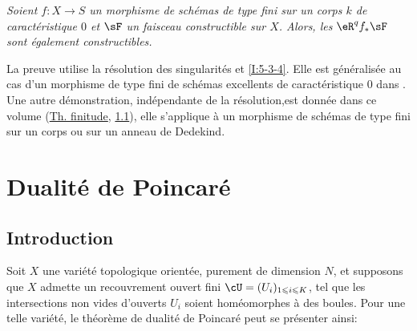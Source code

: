 \begingroup
\renewcommand*{\thesubsubsection}{3.5.2}
\begin{sourceinline}\label{I:5-3-7} %
\itshape
Soient $f:X\to S$ un morphisme de schémas de type fini sur un corps $k$ de 
caractéristique $0$ et $\sF$ un faisceau constructible sur $X$. Alors, les 
$\eR^q f_* \sF$ sont également constructibles.
\end{sourceinline}
\endgroup

La preuve utilise la résolution des singularités et \ref{I:5-3-4}. Elle est 
généralisée au cas d'un morphisme de type fini de schémas excellents de 
caractéristique $0$ dans . Une autre démonstration, 
indépendante de la résolution,est donnée dans ce volume 
(\hyperref[VII]{Th. finitude}, \hyperref[VII:1-1]{1.1}),
elle s'applique à un morphisme de schémas de type fini sur un corps ou sur 
un anneau de Dedekind. 




















\section{Dualité de Poincaré}\label{I:6}










\subsection{Introduction}\label{I:6-1}

Soit $X$ une variété topologique orientée, purement de dimension $N$, et 
supposons que $X$ admette un recouvrement ouvert fini 
$\cU=(U_i)_{1\leqslant i\leqslant K}$, tel que les intersections non vides 
d'ouverts $U_i$ soient homéomorphes à des boules. Pour une telle variété, 
le théorème de dualité de Poincaré peut se présenter ainsi: 

